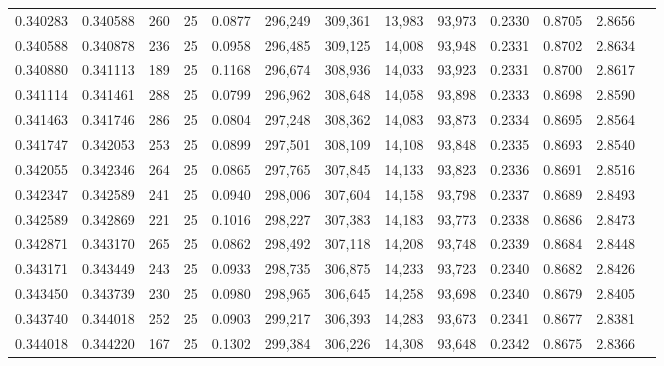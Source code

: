 \begin{tabular}{rrrrrrrrrrrrr}
0.340283 & 0.340588 &   260 &  25 &                                     0.0877 & 296,249 & 309,361 &  13,983 &  93,973 & 0.2330 & 0.8705 & 2.8656 \\
0.340588 & 0.340878 &   236 &  25 &                                     0.0958 & 296,485 & 309,125 &  14,008 &  93,948 & 0.2331 & 0.8702 & 2.8634 \\
0.340880 & 0.341113 &   189 &  25 &                                     0.1168 & 296,674 & 308,936 &  14,033 &  93,923 & 0.2331 & 0.8700 & 2.8617 \\
0.341114 & 0.341461 &   288 &  25 &                                     0.0799 & 296,962 & 308,648 &  14,058 &  93,898 & 0.2333 & 0.8698 & 2.8590 \\
0.341463 & 0.341746 &   286 &  25 &                                     0.0804 & 297,248 & 308,362 &  14,083 &  93,873 & 0.2334 & 0.8695 & 2.8564 \\
0.341747 & 0.342053 &   253 &  25 &                                     0.0899 & 297,501 & 308,109 &  14,108 &  93,848 & 0.2335 & 0.8693 & 2.8540 \\
0.342055 & 0.342346 &   264 &  25 &                                     0.0865 & 297,765 & 307,845 &  14,133 &  93,823 & 0.2336 & 0.8691 & 2.8516 \\
0.342347 & 0.342589 &   241 &  25 &                                     0.0940 & 298,006 & 307,604 &  14,158 &  93,798 & 0.2337 & 0.8689 & 2.8493 \\
0.342589 & 0.342869 &   221 &  25 &                                     0.1016 & 298,227 & 307,383 &  14,183 &  93,773 & 0.2338 & 0.8686 & 2.8473 \\
0.342871 & 0.343170 &   265 &  25 &                                     0.0862 & 298,492 & 307,118 &  14,208 &  93,748 & 0.2339 & 0.8684 & 2.8448 \\
0.343171 & 0.343449 &   243 &  25 &                                     0.0933 & 298,735 & 306,875 &  14,233 &  93,723 & 0.2340 & 0.8682 & 2.8426 \\
0.343450 & 0.343739 &   230 &  25 &                                     0.0980 & 298,965 & 306,645 &  14,258 &  93,698 & 0.2340 & 0.8679 & 2.8405 \\
0.343740 & 0.344018 &   252 &  25 &                                     0.0903 & 299,217 & 306,393 &  14,283 &  93,673 & 0.2341 & 0.8677 & 2.8381 \\
0.344018 & 0.344220 &   167 &  25 &                                     0.1302 & 299,384 & 306,226 &  14,308 &  93,648 & 0.2342 & 0.8675 & 2.8366 \\

\end{tabular}
